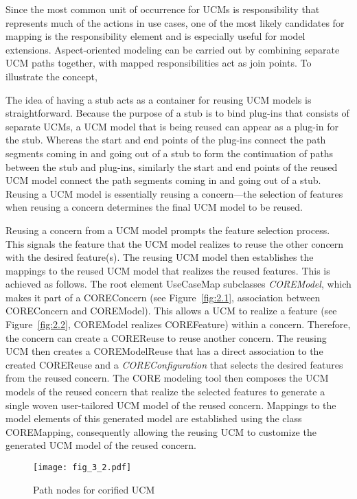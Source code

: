 Since the most common unit of occurrence for UCMs is responsibility that represents much of the actions in use cases, one of the most likely candidates for mapping is the responsibility element and is especially useful for model extensions. Aspect-oriented modeling can be carried out by combining separate UCM paths together, with mapped responsibilities act as join points. To illustrate the concept, %

The idea of having a stub acts as a container for reusing UCM models is straightforward. Because the purpose of a stub is to bind plug-ins that consists of separate UCMs, a UCM model that is being reused can appear as a plug-in for the stub. Whereas the start and end points of the plug-ins connect the path segments coming in and going out of a stub to form the continuation of paths between the stub and plug-ins, similarly the start and end points of the reused UCM model connect the path segments coming in and going out of a stub. Reusing a UCM model is essentially reusing a concern---the selection of features when reusing a concern determines the final UCM model to be reused.

Reusing a concern from a UCM model prompts the feature selection process. This signals the feature that the UCM model realizes to reuse the other concern with the desired feature(s). The reusing UCM model then establishes the mappings to the reused UCM model that realizes the reused features. This is achieved as follows. The root element {\cls UseCaseMap} subclasses \textit{\cls COREModel}, which makes it part of a {\cls COREConcern} (see Figure~\ref{fig:2.1}, association between {\cls COREConcern} and {\cls COREModel}). This allows a UCM to realize a feature (see Figure~\ref{fig:2.2}, {\cls COREModel} realizes {\cls COREFeature}) within a concern. Therefore, the concern can create a {\cls COREReuse} to reuse another concern. The reusing UCM then creates a {\cls COREModelReuse} that has a direct association to the created {\cls COREReuse} and a \textit{\cls COREConfiguration} that selects the desired features from the reused concern. The CORE modeling tool then composes the UCM models of the reused concern that realize the selected features to generate a single woven user-tailored UCM model of the reused concern. Mappings to the model elements of this generated model are established using the class {\cls COREMapping}, consequently allowing the reusing UCM to customize the generated UCM model of the reused concern.

\begin{figure}
	\centering
	\texttt{[image: fig\_3\_2.pdf]}
	\caption{Path nodes for corified UCM}
	\label{fig:3.2}
\end{figure}


